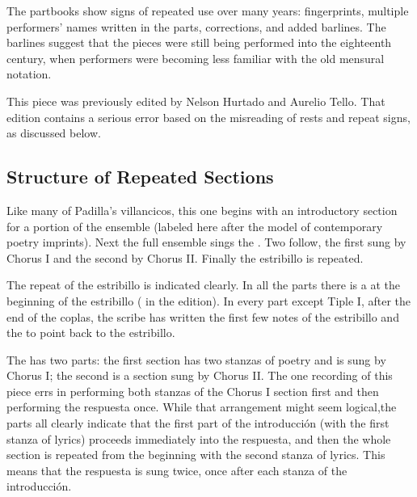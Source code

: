 The partbooks show signs of repeated use over many years: fingerprints, multiple performers' names written in the parts, corrections, and added barlines.
The barlines suggest that the pieces were still being performed into the eighteenth century, when performers were becoming less familiar with the old mensural notation.

This piece was previously edited by Nelson Hurtado and Aurelio Tello.
That edition contains a serious error based on the misreading of rests and repeat signs, as discussed below. %

\subsection*{Structure of Repeated Sections}

Like many of Padilla's villancicos, this one begins with an introductory section for a portion of the ensemble (labeled here  after the model of contemporary poetry imprints).
Next the full ensemble sings the .
Two  follow, the first sung by Chorus I and the second by Chorus II. 
Finally the estribillo is repeated.

The repeat of the estribillo is indicated clearly.
In all the parts there is a  at the beginning of the estribillo ( in the edition).
In every part except Tiple I, after the end of the coplas, the scribe has written the first few notes of the estribillo and the  to point back to the estribillo.

The  has two parts: the first section has two stanzas of poetry and is sung by Chorus I; the second is a  section sung by Chorus II.
The one recording of this piece errs in performing both stanzas of the Chorus I section first and then performing the respuesta once.\autocite{Padilla:HabanaCD}
While that arrangement might seem logical,the parts all clearly indicate that the first part of the introducción (with the first stanza of lyrics) proceeds immediately into the respuesta, and then the whole section is repeated from the beginning with the second stanza of lyrics.
This means that the respuesta is sung twice, once after each stanza of the introducción.

